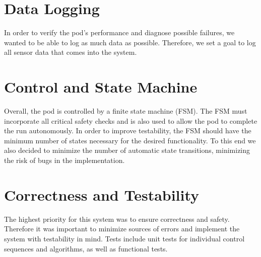 \section{Data Logging}

In order to verify the pod's performance and diagnose possible failures, we wanted to be able to log as much data as possible. Therefore, we set a goal to log all sensor data that comes into the system.


\section{Control and State Machine}

Overall, the pod is controlled by a finite state machine (FSM). The FSM must incorporate all critical safety checks and is also used to allow the pod to complete the run autonomously. In order to improve testability, the FSM should have the minimum number of states necessary for the desired functionality. To this end we also decided to minimize the number of automatic state transitions, minimizing the risk of bugs in the implementation.

\section{Correctness and Testability}

The highest priority for this system was to ensure correctness and safety. Therefore it was important to minimize sources of errors and implement the system with testability in mind. Tests include unit tests for individual control sequences and algorithms, as well as functional tests.



